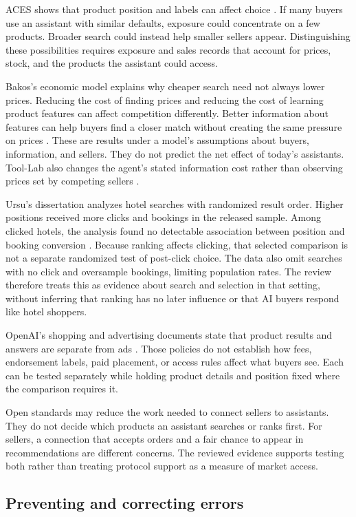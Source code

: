 \documentclass{article}
\begin{document}
ACES shows that product position and labels can affect choice \cite{ref17}. If many buyers use an assistant with similar defaults, exposure could concentrate on a few products. Broader search could instead help smaller sellers appear. Distinguishing these possibilities requires exposure and sales records that account for prices, stock, and the products the assistant could access.

Bakos's economic model explains why cheaper search need not always lower prices. Reducing the cost of finding prices and reducing the cost of learning product features can affect competition differently. Better information about features can help buyers find a closer match without creating the same pressure on prices \cite{ref35}. These are results under a model's assumptions about buyers, information, and sellers. They do not predict the net effect of today's assistants. Tool-Lab also changes the agent's stated information cost rather than observing prices set by competing sellers \cite{ref19}.

Ursu's dissertation analyzes hotel searches with randomized result order. Higher positions received more clicks and bookings in the released sample. Among clicked hotels, the analysis found no detectable association between position and booking conversion \cite{ref36}. Because ranking affects clicking, that selected comparison is not a separate randomized test of post-click choice. The data also omit searches with no click and oversample bookings, limiting population rates. The review therefore treats this as evidence about search and selection in that setting, without inferring that ranking has no later influence or that AI buyers respond like hotel shoppers.

OpenAI's shopping and advertising documents state that product results and answers are separate from ads \cite{ref2,ref20}. Those policies do not establish how fees, endorsement labels, paid placement, or access rules affect what buyers see. Each can be tested separately while holding product details and position fixed where the comparison requires it.

Open standards may reduce the work needed to connect sellers to assistants. They do not decide which products an assistant searches or ranks first. For sellers, a connection that accepts orders and a fair chance to appear in recommendations are different concerns. The reviewed evidence supports testing both rather than treating protocol support as a measure of market access.

\subsection{Preventing and correcting errors}
\end{document}
